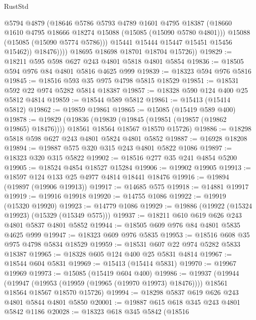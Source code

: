 \begin{lexlean}{RustStd}
\begin{coremodule}
                    @5794
                    @4879
                    (@18646
                      @5786
                      @5793
                      @4789
                      @1601
                      @4795
                      @18387
                      (@18660 @1610 @4795 @18666 @18274 @15088 (@15085 (@15090 @5780 @4801)))
                      @15088
                      (@15085 (@15090 @5774 @5786)))
                    @15441
                    @15444
                    @15447
                    @15451
                    @15456
                    @15462))
                @18476))))
        @18695
        @18698
        @18701
        @18704
        @15726))
@19829 := @18211 @595 @598 @627 @243 @4801 @5818 @4801 @5854
@19836 := @18505 @594 @976 @84 @4801 @5816 @4625 @999
@19839 := @18323 @594 @976 @5816
@19845 := @18516 @593 @35 @975 @4798 @5815 @18529
@19851 := @18531 @592 @22 @974 @5282 @5814 @18387
@19857 := @18328 @590 @124 @400 @25 @5812 @4814
@19859 := @18544 @589 @5812
@19861 := @15413 (@15414 @5812)
@19862 := @19859 @19861
@19865 := @15085 (@15419 @589 @400)
@19878 := @19829
    (@19836
      (@19839 (@19845 (@19851 (@19857 (@19862 @19865) @18476))))
      @18561
      @18564
      @18567
      @18570
      @15726)
@19886 := @18298 @5818 @598 @627 @243 @4801 @5824 @4801 @5852
@19887 := @16928 @18208
@19894 := @19887 @575 @320 @315 @243 @4801 @5822 @1086
@19897 := @18323 @320 @315 @5822
@19902 := @18516 @277 @35 @241 @4854 @5200
@19905 := @18524 @4854 @18527 @15284
@19906 := @19902 @19905
@19913 := @18597 @124 @133 @25 @4977 @4814 @18441 @18476
@19916 := @19894 (@19897 (@19906 @19913))
@19917 := @14685 @575
@19918 := @14881 @19917
@19919 := @19916 @19918
@19920 := @14755 @1086
@19922 := @19919 (@15320 @19920)
@19923 := @14779 @1086
@19929 := @19886 (@19922 (@15324 @19923) (@15329 (@15349 @575)))
@19937 := @18211 @610 @619 @626 @243 @4801 @5837 @4801 @5852
@19944 := @18505 @609 @976 @84 @4801 @5835 @4625 @999
@19947 := @18323 @609 @976 @5835
@19953 := @18516 @608 @35 @975 @4798 @5834 @18529
@19959 := @18531 @607 @22 @974 @5282 @5833 @18387
@19965 := @18328 @605 @124 @400 @25 @5831 @4814
@19967 := @18544 @604 @5831
@19969 := @15413 (@15414 @5831)
@19970 := @19967 @19969
@19973 := @15085 (@15419 @604 @400)
@19986 := @19937
    (@19944
      (@19947 (@19953 (@19959 (@19965 (@19970 @19973) @18476))))
      @18561
      @18564
      @18567
      @18570
      @15726)
@19994 := @18298 @5837 @619 @626 @243 @4801 @5844 @4801 @5850
@20001 := @19887 @615 @618 @345 @243 @4801 @5842 @1186
@20028 := @18323
    @618
    @345
    @5842
    (@18516

\end{coremodule}
\end{lexlean}
